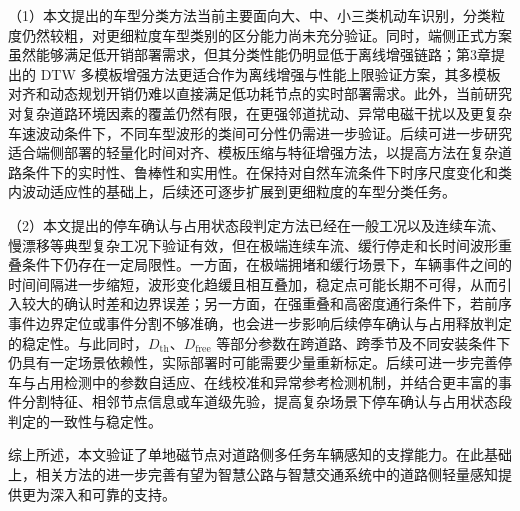 \documentclass{xdupgthesis}
\begin{document}
（1）本文提出的车型分类方法当前主要面向大、中、小三类机动车识别，分类粒度仍然较粗，对更细粒度车型类别的区分能力尚未充分验证。同时，端侧正式方案虽然能够满足低开销部署需求，但其分类性能仍明显低于离线增强链路；第3章提出的 DTW 多模板增强方法更适合作为离线增强与性能上限验证方案，其多模板对齐和动态规划开销仍难以直接满足低功耗节点的实时部署需求。此外，当前研究对复杂道路环境因素的覆盖仍然有限，在更强邻道扰动、异常电磁干扰以及更复杂车速波动条件下，不同车型波形的类间可分性仍需进一步验证。后续可进一步研究适合端侧部署的轻量化时间对齐、模板压缩与特征增强方法\cite{ch5_salvador2007fastdtw}，以提高方法在复杂道路条件下的实时性、鲁棒性和实用性。在保持对自然车流条件下时序尺度变化和类内波动适应性的基础上，后续还可逐步扩展到更细粒度的车型分类任务\cite{ch3_xu2017featuresets}。

（2）本文提出的停车确认与占用状态段判定方法已经在一般工况以及连续车流、慢漂移等典型复杂工况下验证有效，但在极端连续车流、缓行停走和长时间波形重叠条件下仍存在一定局限性。一方面，在极端拥堵和缓行场景下，车辆事件之间的时间间隔进一步缩短，波形变化趋缓且相互叠加，稳定点可能长期不可得，从而引入较大的确认时差和边界误差；另一方面，在强重叠和高密度通行条件下，若前序事件边界定位或事件分割不够准确，也会进一步影响后续停车确认与占用释放判定的稳定性。与此同时，$D_{\mathrm{th}}$、$D_{\mathrm{free}}$ 等部分参数在跨道路、跨季节及不同安装条件下仍具有一定场景依赖性，实际部署时可能需要少量重新标定。后续可进一步完善停车与占用检测中的参数自适应、在线校准和异常参考检测机制\cite{ch5_cao2020magcal}，并结合更丰富的事件分割特征、相邻节点信息或车道级先验，提高复杂场景下停车确认与占用状态段判定的一致性与稳定性。

综上所述，本文验证了单地磁节点对道路侧多任务车辆感知的支撑能力。在此基础上，相关方法的进一步完善有望为智慧公路与智慧交通系统中的道路侧轻量感知提供更为深入和可靠的支持。
\end{document}
